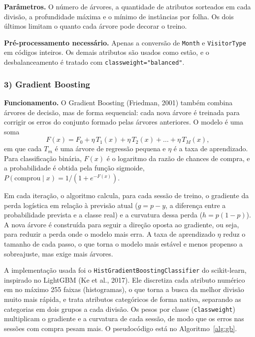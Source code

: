 \documentclass[11pt,a4paper]{article}
\DeclareRobustCommand{\atr}[1]{{\renewcommand{\_}{\textunderscore\allowbreak}\texttt{#1}}}
\begin{document}
\textbf{Parâmetros.} O número de árvores, a quantidade de atributos sorteados em cada divisão, a profundidade máxima e
o mínimo de instâncias por folha. Os dois últimos limitam o quanto cada árvore pode decorar o treino.

\textbf{Pré-processamento necessário.} Apenas a conversão de \atr{Month} e \atr{VisitorType} em códigos inteiros. Os
demais atributos são usados como estão, e o desbalanceamento é tratado com \atr{class\_weight="balanced"}.

\subsubsection*{3) Gradient Boosting}

\textbf{Funcionamento.} O Gradient Boosting (Friedman, 2001) também combina árvores de decisão, mas de forma
sequencial: cada nova árvore é treinada para corrigir os erros do conjunto formado pelas árvores anteriores. O modelo
é uma soma
\begin{equation*}
  F(x) = F_0 + \eta\,T_1(x) + \eta\,T_2(x) + \dots + \eta\,T_M(x),
\end{equation*}
em que cada $T_m$ é uma árvore de regressão pequena e $\eta$ é a taxa de aprendizado. Para classificação binária,
$F(x)$ é o logaritmo da razão de chances de compra, e a probabilidade é obtida pela função sigmoide,
$P(\text{comprou} \mid x) = 1 / (1 + e^{-F(x)})$.

Em cada iteração, o algoritmo calcula, para cada sessão de treino, o gradiente da perda logística em relação à
previsão atual ($g = p - y$, a diferença entre a probabilidade prevista e a classe real) e a curvatura dessa perda
($h = p(1-p)$). A nova árvore é construída para seguir a direção oposta ao gradiente, ou seja, para reduzir a perda
onde o modelo mais erra. A taxa de aprendizado $\eta$ reduz o tamanho de cada passo, o que torna o modelo mais
estável e menos propenso a sobreajuste, mas exige mais árvores.

A implementação usada foi o \atr{HistGradientBoostingClassifier} do scikit-learn, inspirado no LightGBM (Ke et al.,
2017). Ele discretiza cada atributo numérico em no máximo 255 faixas (histogramas), o que torna a busca da melhor
divisão muito mais rápida, e trata atributos categóricos de forma nativa, separando as categorias em dois grupos a
cada divisão. Os pesos por classe (\atr{class\_weight}) multiplicam o gradiente e a curvatura de cada sessão, de modo
que os erros nas sessões com compra pesam mais. O pseudocódigo está no Algoritmo~\ref{alg:gb}.
\end{document}

